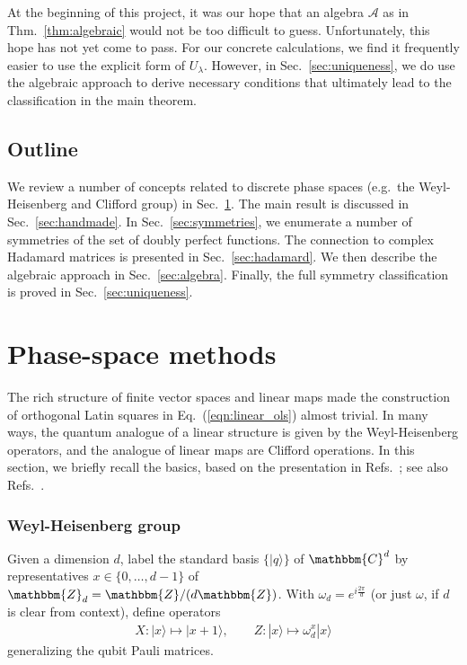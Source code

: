 \documentclass[aps,nofootinbib,floatfix,a4paper]{revtex4}
\newcommand{\1}{\mbox{$\mathbf{1}$}}
\def\ZZ{\mathbbm{Z}}
\def\CC{\mathbbm{C}}
\def\A{\mathcal{A}}
\begin{document}
At the beginning of this project,
it was our hope that an algebra $\A$ as in Thm.~\ref{thm:algebraic} would not be too difficult to guess.
Unfortunately, this hope has not yet come to pass.
For our concrete calculations, we find it frequently easier to use the explicit form of $U_\lambda$.
However, in Sec.~\ref{sec:uniqueness}, we do use the algebraic approach to derive necessary conditions that ultimately lead to the classification in the main theorem.

\subsection{Outline}

We review a number of concepts related to discrete phase spaces 
(e.g.\ the Weyl-Heisenberg and Clifford group) 
in Sec.~\ref{sec:phase_space}.
The main result is discussed in Sec.~\ref{sec:handmade}.
In Sec.~\ref{sec:symmetries}, we enumerate a number of symmetries of the set of doubly perfect functions.
The connection to complex Hadamard matrices is presented in Sec.~\ref{sec:hadamard}.
We then describe the algebraic approach in Sec.~\ref{sec:algebra}.
Finally, the full symmetry classification is proved in Sec.~\ref{sec:uniqueness}.

\section{Phase-space methods}
\label{sec:phase_space}

The rich structure of finite vector spaces and linear maps made the construction of orthogonal Latin squares in Eq.~(\ref{eqn:linear_ols}) almost trivial.
In many ways, the quantum analogue of a linear structure is given by the Weyl-Heisenberg operators,
and the analogue of linear maps are Clifford operations.
In this section, we briefly recall the basics, based on the presentation in Refs.~\cite{gross2021schur, gross2006hudson}; see also Refs.~\cite{gottesman1998heisenberg,NielsenChuang2011}.

\subsubsection{Weyl-Heisenberg group}

Given a dimension $d$,
label the standard basis $\{|q\rangle\}$ of $\CC^d$ by representatives $x\in\{0, \dots, d-1\}$ of $\ZZ_d=\ZZ/(d\ZZ)$.
With $\omega_d=e^{i\frac{2\pi}d}$ (or just $\omega$, if $d$ is clear from context), define operators
\begin{align*}
	X: |x\rangle \mapsto |x+1\rangle,
	\qquad
	Z: |x\rangle \mapsto \omega_d^{x}|x\rangle
\end{align*}
generalizing the qubit Pauli matrices.
\end{document}
